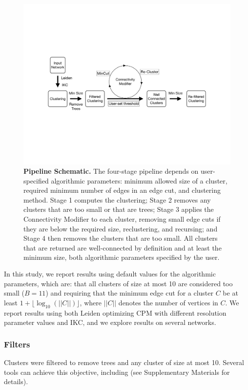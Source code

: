 \documentclass[11pt]{article}   	%
\begin{document}
\begin{figure}[H]
\centering
\includegraphics[width=0.8\linewidth]{figs/workflow.pdf}
\caption{\textbf{Pipeline Schematic.} The four-stage pipeline depends on user-specified algorithmic parameters: minimum allowed size of a cluster, required minimum number of edges in an edge cut, and clustering method.  Stage 1 computes the clustering; Stage 2 removes any clusters that are too small or that are trees;  Stage 3 applies the  Connectivity Modifier to each cluster, removing small edge cuts if they are below the required size, reclustering, and recursing;  and Stage 4 then removes the clusters that are too small. All clusters that are returned are well-connected by definition and at least the minimum size, both algorithmic parameters specified by the user.}
\end{figure}




In this study, we report results using default values for the algorithmic parameters, which are: that all clusters of size at most 10 are considered too small ($B=11$) and requiring that the minimum edge cut for a cluster $C$ be at least  $ 1+ \lfloor \log_{10}(||C||) \rfloor$,  where $||C||$ denotes the number of vertices in $C$.
We report results using both Leiden optimizing CPM with different resolution parameter values and IKC, and we explore results on several networks.


\subsubsection{Filters} Clusters were filtered to remove trees and any cluster of size at most 10. Several tools can achieve this objective, including \cite{belinda2022} (see Supplementary Materials for details).
\end{document}
